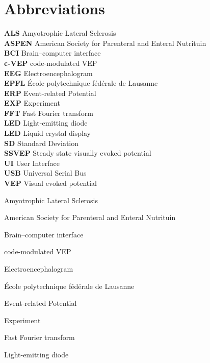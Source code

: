 \chapter{Abbreviations}
\textbf{ALS} Amyotrophic Lateral Sclerosis\\
\textbf{ASPEN}	American Society for Parenteral and Enteral Nutrituin\\
\textbf{BCI}	Brain–computer interface\\
\textbf{c-VEP}	code-modulated VEP\\
\textbf{EEG}	Electroencephalogram\\
\textbf{EPFL}	École polytechnique fédérale de Lausanne\\
\textbf{ERP}	Event-related Potential\\
\textbf{EXP}	Experiment\\
\textbf{FFT}	Fast Fourier transform\\
\textbf{LED}	Light-emitting diode\\
\textbf{LED}	Liquid crystal display\\
\textbf{SD}		Standard Deviation\\
\textbf{SSVEP}	Steady state visually evoked potential\\
\textbf{UI}		User Interface\\
\textbf{USB}		Universal Serial Bus\\
\textbf{VEP}		Visual evoked potential\\
\begin{description}[align=left]
	\item [ALS]  Amyotrophic Lateral Sclerosis
	\item [ASPEN] American Society for Parenteral and Enteral Nutrituin
	\item [BCI] Brain–computer interface
	\item[c-VEP] code-modulated VEP
	\item[EEG] Electroencephalogram
	\item[EPFL] École polytechnique fédérale de Lausanne
	\item[ERP] Event-related Potential
	\item[EXP] Experiment
	\item[FFT] Fast Fourier transform
	\item[LED] Light-emitting diode
	
\end{description}